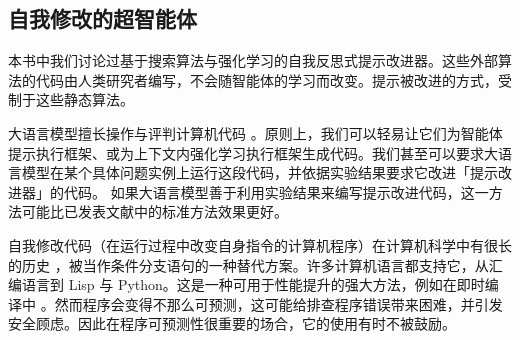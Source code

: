 

\subsection{自我修改的超智能体}
本书中我们讨论过基于搜索算法与强化学习的自我反思式提示改进器。这些外部算法的代码由人类研究者编写，不会随智能体的学习而改变。提示被改进的方式，受制于这些静态算法。

大语言模型擅长操作与评判计算机代码 \citep{zhuge2024agent}。原则上，我们可以轻易让它们为智能体提示执行框架、或为上下文内强化学习执行框架生成代码。我们甚至可以要求大语言模型在某个具体问题实例上运行这段代码，并依据实验结果要求它改进「提示改进器」的代码。
如果大语言模型善于利用实验结果来编写提示改进代码，这一方法可能比已发表文献中的标准方法效果更好。

自我修改代码（在运行过程中改变自身指令的计算机程序）在计算机科学中有很长的历史 \citep{cai2007certified}，被当作条件分支语句的一种替代方案。许多计算机语言都支持它，从汇编语言到 Lisp \citep{abelson2022structure} 与 Python。这是一种可用于性能提升的强大方法，例如在即时编译中 \citep{ansel2011language}。然而程序会变得不那么可预测，这可能给排查程序错误带来困难，并引发安全顾虑。因此在程序可预测性很重要的场合，它的使用有时不被鼓励。

